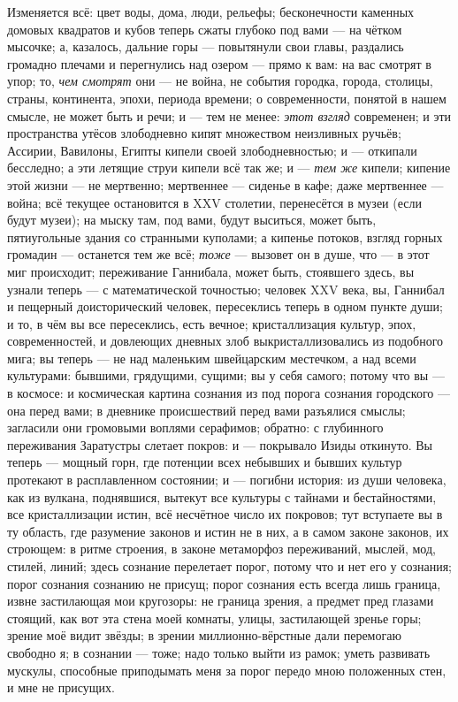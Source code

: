 \documentclass[12pt,a4paper,oneside]{book}
\begin{document}
Изменяется всё: цвет воды, дома, люди, рельефы; бесконечности каменных домовых квадратов и кубов теперь сжаты глубоко под вами — на чётком мысочке; а, казалось, дальние горы — повытянули свои главы, раздались громадно плечами и перегнулись над озером — прямо к вам: на вас смотрят в упор; то, \emph{чем смотрят} они — не война, не события городка, города, столицы, страны, континента, эпохи, периода времени; о современности, понятой в нашем смысле, не может быть и речи; и — тем не менее: \emph{этот взгляд} современен; и эти пространства утёсов злободневно кипят множеством неизливных ручьёв; Ассирии, Вавилоны, Египты кипели своей злободневностью; и — откипали бесследно; а эти летящие струи кипели всё так же; и — \emph{тем же} кипели; кипение этой жизни — не мертвенно; мертвеннее — сиденье в кафе; даже мертвеннее — война; всё текущее остановится в XXV столетии, перенесётся в музеи (если будут музеи); на мыску там, под вами, будут выситься, может быть, пятиугольные здания со странными куполами; а кипенье потоков, взгляд горных громадин — останется тем же всё; \emph{тоже} — вызовет он в душе, что — в этот миг происходит; переживание Ганнибала, может быть, стоявшего здесь, вы узнали теперь — с математической точностью; человек XXV века, вы, Ганнибал и пещерный доисторический человек, пересеклись теперь в одном пункте души; и то, в чём вы все пересеклись, есть вечное; кристаллизация культур, эпох, современностей, и довлеющих дневных злоб выкристаллизовались из подобного мига; вы теперь — не над маленьким швейцарским местечком, а над всеми культурами: бывшими, грядущими, сущими; вы у себя самого; потому что вы — в космосе: и космическая картина сознания из под порога сознания городского — она перед вами; в дневнике происшествий перед вами разъялися смыслы; загласили они громовыми воплями серафимов; обратно: с глубинного переживания Заратустры слетает покров: и — покрывало Изиды откинуто. Вы теперь — мощный горн, где потенции всех небывших и бывших культур протекают в расплавленном состоянии; и — погибни история: из души человека, как из вулкана, поднявшися, вытекут все культуры с тайнами и бестайностями, все кристаллизации истин, всё несчётное число их покровов; тут вступаете вы в ту область, где разумение законов и истин не в них, а в самом законе законов, их строющем: в ритме строения, в законе метаморфоз переживаний, мыслей, мод, стилей, линий; здесь сознание перелетает порог, потому что и нет его у сознания; порог сознания сознанию не присущ; порог сознания есть всегда лишь граница, извне застилающая мои кругозоры: не граница зрения, а предмет пред глазами стоящий, как вот эта стена моей комнаты, улицы, застилающей зренье горы; зрение моё видит звёзды; в зрении миллионно-вёрстные дали перемогаю свободно я; в сознании — тоже; надо только выйти из рамок; уметь развивать мускулы, способные приподымать меня за порог передо мною положенных стен, и мне не присущих.
\end{document}
